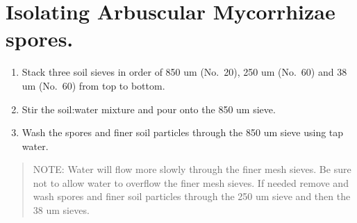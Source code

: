 \documentclass[]{book}
\providecommand{\tightlist}{%
  \setlength{\itemsep}{0pt}\setlength{\parskip}{0pt}}
\begin{document}
\hypertarget{isolating-arbuscular-mycorrhizae-spores.}{%
\section{Isolating Arbuscular Mycorrhizae spores.}\label{isolating-arbuscular-mycorrhizae-spores.}}

\begin{enumerate}
\def\labelenumi{\arabic{enumi}.}
\tightlist
\item
  Stack three soil sieves in order of 850 um (No.~20), 250 um (No.~60) and 38 um (No.~60) from top to bottom.
\item
  Stir the soil:water mixture and pour onto the 850 um sieve.
\item
  Wash the spores and finer soil particles through the 850 um sieve using tap water.
\end{enumerate}

\begin{quote}
NOTE: Water will flow more slowly through the finer mesh sieves. Be sure not to allow water to overflow the finer mesh sieves. If needed remove and wash spores and finer soil particles through the 250 um sieve and then the 38 um sieves.
\end{quote}
\end{document}
